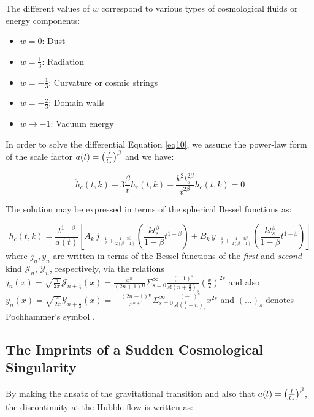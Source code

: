 \documentclass[universe,article,accept,moreauthors,pdftex]{Definitions/mdpi}
\begin{document}
The different values of $w$ correspond to various types of cosmological fluids or energy components:

\begin{itemize}
\item $w = 0$: Dust
\item $w = \frac{1}{3}$: Radiation
\item $w = -\frac{1}{3}$: Curvature or cosmic strings
\item $w = -\frac{2}{3}$: Domain walls
\item $w \to -1$: Vacuum energy
\end{itemize}


In order to solve the differential Equation \eqref{eq10}, we assume the power-law form of the scale factor $a(t)=\big{(}\frac{t}{t_{s}}\big{)}^{\beta}$ and we have:

\begin{equation}\label{relation4}
\ddot{h}_{c}(t,k) + 3 \frac{\beta}{t}\dot{h}_{c}(t,k) + \frac{k^{2}t_{s}^{2\beta}}{t^{2\beta}}h_{c}(t,k) = 0
\end{equation}

The solution may be expressed in terms of the spherical Bessel functions as:

\begin{equation}\label{relation3}
h_{c}(t,k) = \frac{t^{1-\beta}}{a(t)}\left[A_{k}\, j_{-\frac{1}{2}+\frac{1-3\beta}{2(\beta-1)}}\left(\frac{kt_{s}^{\beta}}{1-\beta} t^{1-\beta}\right) + B_{k}\, y_{-\frac{1}{2}+\frac{1-3\beta}{2(\beta-1)}}\left(\frac{kt_{s}^{\beta}}{1-\beta} t^{1-\beta}\right)\right]
\end{equation}
where $j_{n},y_{n}$ are written in terms of the Bessel functions of the \textit{first} and \textit{second} kind $\mathcal{J}_{n},\,\mathcal{Y}_{n}$, respectively, via the relations $j_{n}(x)=\sqrt{\frac{\pi}{2x}}\mathcal{J}_{n+\frac{1}{2}}(x)=\frac{x^n}{(2n+1)!!}\Sigma_{s=0}^{\infty}\frac{(-1)^s}{s!(n+\frac{3}{2})_{s}}(\frac{x}{2})^{2s}$ and also $y_{n}(x)=\sqrt{\frac{\pi}{2x}}\mathcal{Y}_{n+\frac{1}{2}}(x)=-\frac{(2n-1)!!}{x^{n+1}}\Sigma_{s=0}^{\infty}\frac{(-1)^s}{s!(\frac{1}{2}-n)_{s}}x^{2s}$ and $(...)_{s}$ denotes  Pochhammer's symbol \cite{arfken2012mathematical}.

\subsection{The Imprints of a Sudden Cosmological Singularity}

By making the ansatz of the gravitational transition and also that $a(t)=\big{(}\frac{t}{t_{s}}\big{)}^{\beta}$,  the discontinuity at the Hubble flow is written as:
\end{document}
